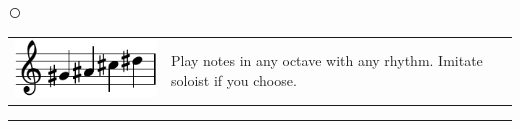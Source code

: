 \documentclass[12pt]{article}
\begin{document}
\textcircled{}

\begin{tabular}{l l}
\begin{minipage}{0.5\textwidth}
\includegraphics[scale=1.5]{gacd.pdf}
\end{minipage}
&
\begin{minipage}{0.4\textwidth}
Play notes in any octave with any rhythm. Imitate soloist if you choose. 
\end{minipage}
\end{tabular}

\vspace{0.3cm}

\hrule
\end{document}
